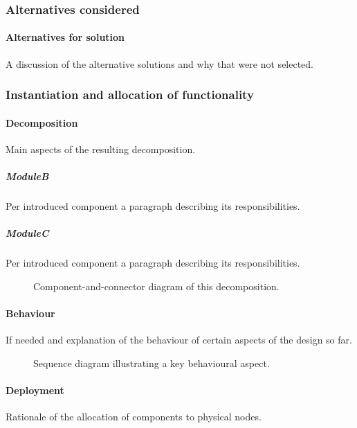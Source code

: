 \documentclass[a4paper,10pt]{article}
\begin{document}
\subsubsection*{Alternatives considered}
\paragraph{Alternatives for solution}
A discussion of the alternative solutions and why that were not selected.

\subsubsection{Instantiation and allocation of functionality}
\paragraph{Decomposition}
Main aspects of the resulting decomposition.

\subparagraph{ModuleB}
Per introduced component a paragraph describing its responsibilities.

\subparagraph{ModuleC}
Per introduced component a paragraph describing its responsibilities.

\begin{figure}[!htp]
	\centering
	\caption{Component-and-connector diagram of this decomposition.
	}\label{fig:it1-cc_main}
\end{figure}

\paragraph{Behaviour}
If needed and explanation of the behaviour of certain aspects of the design so
far.

\begin{figure}[!htp]
	\centering
	\caption{Sequence diagram illustrating a key behavioural aspect.
	}\label{fig:it1-seq_aspect1}
\end{figure}

\paragraph{Deployment}
Rationale of the allocation of components to physical nodes.
\end{document}
